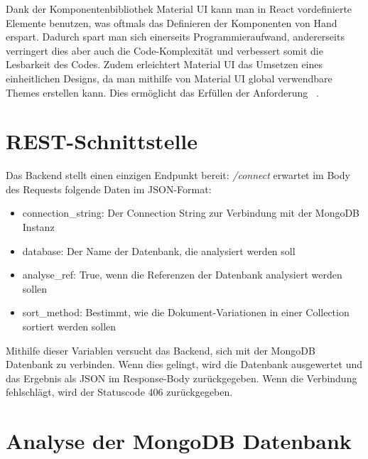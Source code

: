 Dank der Komponentenbibliothek Material UI kann man in React vordefinierte Elemente benutzen, was oftmals das Definieren der Komponenten von Hand erspart.
Dadurch spart man sich einerseits Programmieraufwand, andererseits verringert dies aber auch die Code-Komplexität und verbessert somit die Lesbarkeit des Codes.
Zudem erleichtert Material UI das Umsetzen eines einheitlichen Designs, da man mithilfe von Material UI global verwendbare Themes erstellen kann.
Dies ermöglicht das Erfüllen der Anforderung ~.
~\autocite{mui:mui}

\section{REST-Schnittstelle}
\label{sec:rest_schnittstelle}
Das Backend stellt einen einzigen Endpunkt bereit: 
\textit{/connect} erwartet im Body des Requests folgende Daten im JSON-Format:
\begin{itemize}
    \item connection\_string: Der Connection String zur Verbindung mit der MongoDB Instanz
    \item database: Der Name der Datenbank, die analysiert werden soll
    \item analyse\_ref: True, wenn die Referenzen der Datenbank analysiert werden sollen
    \item sort\_method: Bestimmt, wie die Dokument-Variationen in einer Collection sortiert werden sollen
\end{itemize}
Mithilfe dieser Variablen versucht das Backend, sich mit der MongoDB Datenbank zu verbinden.
Wenn dies gelingt, wird die Datenbank ausgewertet und das Ergebnis als JSON im Response-Body zurückgegeben.
Wenn die Verbindung fehlschlägt, wird der Statuscode 406 zurückgegeben.

\section{Analyse der MongoDB Datenbank}
\label{sec:mongoDB_analyse}


